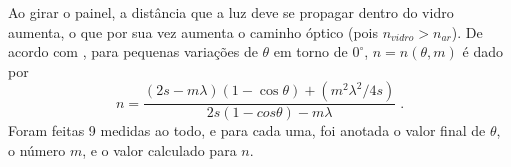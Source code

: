 Ao girar o painel, a distância que a luz deve se propagar dentro do vidro aumenta, o que por sua vez aumenta o caminho óptico (pois $n_{vidro} > n_{ar}$).
De acordo com , para pequenas variações de $\theta$ em torno de $0^{\circ}$, $n=n(\theta, m)$ é dado por 
\begin{equation}
	n = \frac{ (2s-m\lambda)(1-\cos\theta) + (m^2\lambda^2/4s)}{   2s(1-cos\theta)-m\lambda   } \;.
\end{equation}
Foram feitas 9 medidas ao todo, e para cada uma, foi anotada o valor final de $\theta$, o número $m$, e o valor calculado para $n$.
